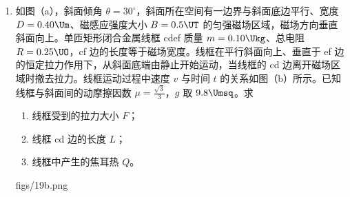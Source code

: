 \documentclass[\gkver]{gaokaozhenti}
\begin{document}
\begin{enumerate}
{\begin{enumerate}
	\item
	挡光片宽度，光电门到小车的距离

	\item
	小车运动时钩码向下做加速运动，由牛顿第二定律可知绳的拉力小于钩码的总重力

	\item
	B

\end{enumerate}
}

\item
如图（a），斜面倾角 $\theta = 30^{\circ}$，斜面所在空间有一边界与斜面底边平行、宽度 $D = 0.40 \Um$、磁感应强度大小 $B = 0.5 \UT$ 的匀强磁场区域，磁场方向垂直斜面向上。单匝矩形闭合金属线框 cdef 质量 $m = 0.10 \Ukg$、总电阻 $R = 0.25 \UO$，cf 边的长度等于磁场宽度。线框在平行斜面向上、垂直于 ef 边的恒定拉力作用下，从斜面底端由静止开始运动，当线框的 cd 边离开磁场区域时撤去拉力。线框运动过程中速度 $v$ 与时间 $t$ 的关系如图（b）所示。已知线框与斜面间的动摩擦因数 $\mu = \frac{\sqrt{3}}{3}$，$g$ 取 $9.8 \Umsq$。求
\begin{enumerate}
	\item
	线框受到的拉力大小 $F$；
	\item
	线框 cd 边的长度 $L$；
	\item
	线框中产生的焦耳热 $Q$。
\end{enumerate}
{figs/19b.png}
\end{enumerate}
\end{document}

